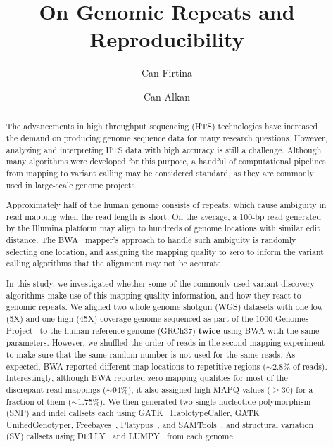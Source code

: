 \documentclass[a4paper]{article}
\date{}
\def\titulo#1{\title{#1}}
\begin{document}
\titulo{On Genomic Repeats and Reproducibility}

\author[1]{Can Firtina}
\author[1]{Can Alkan}

\maketitle
\thispagestyle{empty}


\begin{abstract}
The advancements in high throughput sequencing (HTS) technologies have increased the demand on producing  genome sequence data for many research questions. However, analyzing and interpreting HTS data with high accuracy is still a challenge. 
Although many algorithms were developed for this purpose, a handful of computational pipelines from mapping to variant calling may be considered standard, as they are commonly used in large-scale genome projects.

Approximately half of the human genome consists of repeats, which cause ambiguity in read mapping when the read length is short. On the average, a 100-bp read generated by the Illumina platform may align to hundreds of genome locations with similar edit distance. 
The BWA~\cite{Li2009a} mapper's  approach to handle such ambiguity is randomly selecting one location, and assigning the mapping quality to zero to inform the variant calling algorithms that the alignment may not be accurate. 

In this study, we investigated whether some of the commonly used variant discovery algorithms
make use of this mapping quality information, and how they react to genomic repeats.
We aligned two whole genome shotgun (WGS) datasets with one low (5X) and one high (45X) coverage genome
sequenced as part of the 1000 Genomes Project~\cite{1000GP2012} to the human reference genome (GRCh37) {\bf twice} using BWA with the same parameters. However, we shuffled the order of reads in the second mapping experiment to make sure that the same random number is not used for the same reads.
As expected, BWA reported different map locations to repetitive regions ($\sim$2.8\% of reads). Interestingly, although BWA reported zero mapping qualities for 
most of the discrepant read mappings ($\sim$94\%), it also assigned high MAPQ values ($\geq$30) for a fraction of them ($\sim$1.75\%). 
We then generated two single nucleotide polymorphism (SNP) and indel callsets each using GATK~\cite{DePristo2011} HaplotypeCaller, GATK UnifiedGenotyper, Freebayes~\cite{Garrison2012}, Platypus~\cite{Rimmer2014}, and SAMTools~\cite{Li2009b}, and structural variation (SV)
callsets using DELLY~\cite{Rausch2012} and LUMPY~\cite{Layer2014} from each genome.


\end{abstract}
\end{document}
